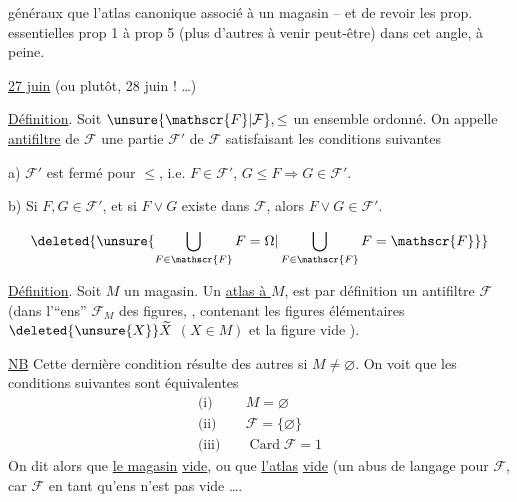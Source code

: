 généraux que l'atlas canonique associé à un magasin -- et de revoir les prop. essentielles prop 1 à prop 5 (plus d'autres à venir peut-être) dans cet angle,   à peine.

\uline{27 juin} (ou plutôt, 28 juin ! \ldots)

\uline{Définition}. Soit $\unsure{\mathscr{F}|\mathcal{F}},\leq$ un ensemble ordonné. On appelle \uline{antifiltre} de $\mathscr{F}$ une partie $\mathscr{F}'$ de $\mathscr{F}$ satisfaisant les conditions suivantes

a) $\mathscr{F}'$ est fermé pour $\leq$, i.e. $F\in\mathscr{F}'$, $G\leq F\Rightarrow G\in\mathscr{F}'$.

b) Si $F,G\in\mathscr{F}'$, et si $F\vee G$ existe dans $\mathscr{F}$, alors $F\vee G\in\mathscr{F}'$.

\[
\deleted{\unsure{\bigcup_{F\in\mathscr{F}}F=\Omega|\bigcup_{F\in\mathscr{F}}F=\mathscr{F}}}
\]

\uline{Définition}. Soit $M$ un magasin. Un \uline{atlas  à $M$},  est par définition un antifiltre $\mathscr{F}$ (dans l'``ens'' $\mathscr{F}_M$ des figures, ,  contenant les  figures élémentaires $\deleted{\unsure{X}}\widetilde{X}$ $(X\in M)$ et la figure vide ).


\uline{NB} Cette dernière condition résulte des autres si $M\neq\varnothing$. On voit que les conditions suivantes sont équivalentes
\[
\begin{aligned}
\text{(i)}\quad&M=\varnothing\\
\text{(ii)}\quad&\mathscr{F}=\{\varnothing\}\\
\text{(iii)}\quad&\operatorname{Card}\mathscr{F}=1
\end{aligned}
\]
On dit  alors que \uline{le magasin}   \uline{vide}, ou que \uline{l'atlas}   \uline{vide} (un abus de langage pour $\mathscr{F}$, car $\mathscr{F}$ en tant qu'ens n'est pas vide \ldots.

